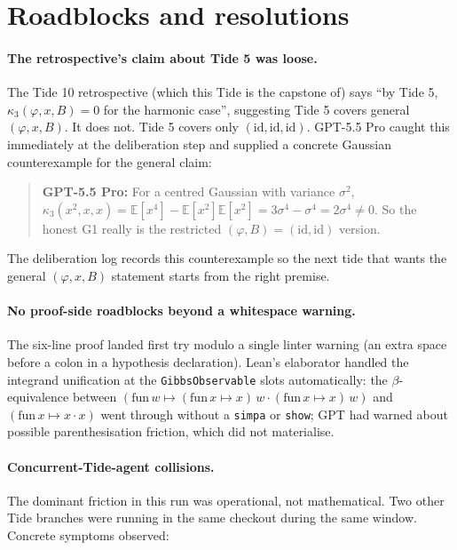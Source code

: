\documentclass[11pt]{article}
\newcommand{\gptbox}[1]{\par\medskip\begin{quote}\small\textbf{\textcolor{green!50!black}{GPT-5.5 Pro:}} #1\end{quote}\medskip}
\begin{document}
\section{Roadblocks and resolutions}

\paragraph{The retrospective's claim about Tide 5 was loose.} The
Tide 10 retrospective (which this Tide is the capstone of) says
``by Tide 5, $\kappa_3(\varphi, x, B) = 0$ for the harmonic case'',
suggesting Tide 5 covers general $(\varphi, x, B)$. It does not. Tide 5
covers only $(\mathrm{id}, \mathrm{id}, \mathrm{id})$. GPT-5.5 Pro
caught this immediately at the deliberation step and supplied a
concrete Gaussian counterexample for the general claim:

\gptbox{For a centred Gaussian with variance $\sigma^2$,
$\kappa_3(x^2, x, x) = \mathbb{E}[x^4] - \mathbb{E}[x^2]\mathbb{E}[x^2]
= 3\sigma^4 - \sigma^4 = 2\sigma^4 \neq 0$. So the honest G1 really is
the restricted $(\varphi, B) = (\mathrm{id}, \mathrm{id})$ version.}

The deliberation log records this counterexample so the next tide
that wants the general $(\varphi, x, B)$ statement starts from the
right premise.

\paragraph{No proof-side roadblocks beyond a whitespace warning.} The
six-line proof landed first try modulo a single linter warning (an
extra space before a colon in a hypothesis declaration). Lean's
elaborator handled the integrand unification at the
\texttt{GibbsObservable} slots automatically: the
$\beta$-equivalence between $(\mathrm{fun}\,w \mapsto (\mathrm{fun}\,x
\mapsto x)\,w \cdot (\mathrm{fun}\,x \mapsto x)\,w)$ and $(\mathrm{fun}\,x
\mapsto x \cdot x)$ went through without a \texttt{simpa} or
\texttt{show}; GPT had warned about possible
parenthesisation friction, which did not materialise.

\paragraph{Concurrent-Tide-agent collisions.} The dominant friction
in this run was operational, not mathematical. Two other Tide branches
were running in the same checkout
during the same window. Concrete symptoms observed:
\end{document}
